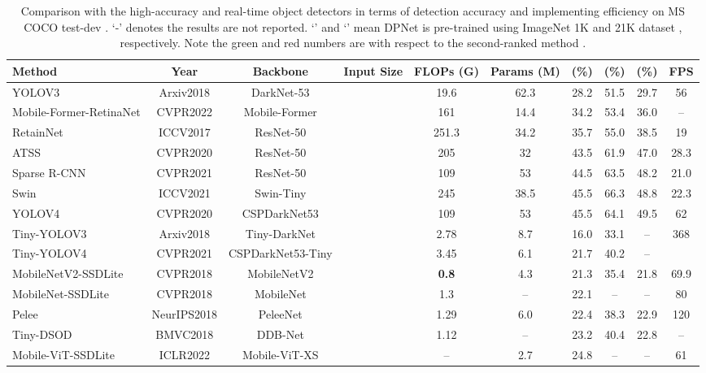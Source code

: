 \documentclass[lettersize,journal]{IEEEtran}
\begin{document}
\begin{table*}[t!]
\tabcolsep 0.9mm \caption{Comparison with the high-accuracy and real-time object detectors in terms of detection accuracy and implementing efficiency on MS COCO test-dev \cite{lin2014microsoft}. ‘-’ denotes the results are not reported. ‘’ and ‘’ mean DPNet is pre-trained using ImageNet 1K and 21K dataset \cite{deng2009imagenet}, respectively. Note the green and red numbers are with respect to the second-ranked method \cite{qin2019thundernet}.} 
	\begin{center}
	\begin{tabular}{l|c|c|c|c|c|c|c|c|c}
			\toprule Method&Year&Backbone&Input Size&FLOPs (G) & Params (M) &  (\%) & (\%) & (\%) & FPS\\
\midrule		
			YOLOV3 \cite{redmon2018yolov3}&Arxiv2018&DarkNet-53 &  &19.6 &62.3 &28.2 &51.5&29.7&56\\
			Mobile-Former-RetinaNet\cite{chen2021mobile} &CVPR2022 &Mobile-Former &  &161 &14.4 &34.2&53.4&36.0&--\\
			RetainNet \cite{lin2017focal} &ICCV2017&ResNet-50&  &251.3 &34.2 &35.7&55.0&38.5&19\\
			ATSS\cite{zhang2020bridging}  &CVPR2020&ResNet-50 & &205 & 32 &43.5 &61.9&47.0 &28.3\\		
			Sparse R-CNN\cite{sun2021sparse}  &CVPR2021&ResNet-50 & &109 & 53 &44.5 &63.5&48.2 &21.0\\
			Swin \cite{liu2021Swin}&ICCV2021 &Swin-Tiny & &245 &38.5 &45.5 &66.3&48.8&22.3\\
			YOLOV4 \cite{wang2021scaled} &CVPR2020&CSPDarkNet53 & &109 & 53 &45.5 &64.1&49.5 &62\\
\midrule
			Tiny-YOLOV3 \cite{redmon2018yolov3} &Arxiv2018&Tiny-DarkNet & &2.78 & 8.7 &16.0&33.1&-- &368\\
Tiny-YOLOV4 \cite{wang2021scaled} &CVPR2021& CSPDarkNet53-Tiny &&3.45 & 6.1 &21.7&40.2&--& \\ 		
			MobileNetV2-SSDLite \cite{sandler2018mobilenetv2}  &CVPR2018 & MobileNetV2 && \textbf{0.8} & 4.3 &21.3&35.4&21.8&69.9\\
			MobileNet-SSDLite \cite{sandler2018mobilenetv2}  &CVPR2018 & MobileNet && 1.3 & -- &22.1&--&--&80\\
			Pelee \cite{Pelee} &NeurIPS2018 &PeleeNet&  &1.29 & 6.0 &22.4&38.3&22.9 &120\\
			Tiny-DSOD \cite{li2018tiny}&BMVC2018 &DDB-Net&  &1.12 & -- &23.2&40.4&22.8 & --\\
Mobile-ViT-SSDLite \cite{mehta2021mobilevit}&ICLR2022 &Mobile-ViT-XS & &--&2.7 &24.8&--&--&61\\

\end{tabular}
\end{center}
\end{table*}
\end{document}
